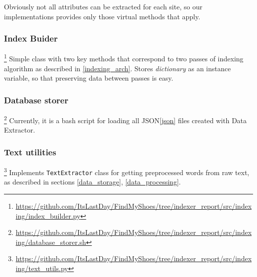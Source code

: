     Obviously not all attributes can be extracted for each site, so our implementations provides only those virtual methods that apply.
\subsubsection{Index Buider}
\footnote{\label{IndexBuilder}\url{https://github.com/ItsLastDay/FindMyShoes/tree/indexer_report/src/indexing/index_builder.py}}
Simple class with two key methods that correspond to two passes of indexing algorithm as de\-scribed in 
\ref{indexing_arch}. Stores \textit{dictionary} as an instance variable, so that pre\-serv\-ing data between passes is easy.


\subsubsection{Database storer}
\footnote{\url{https://github.com/ItsLastDay/FindMyShoes/tree/indexer_report/src/indexing/database_storer.sh}}
Currently, it is a bash script for loading all JSON\cref{json} files created with Data Extractor.

\subsubsection{Text utilities}
\footnote{\url{https://github.com/ItsLastDay/FindMyShoes/tree/indexer_report/src/indexing/text_utils.py}}
Implements \texttt{TextExtractor} class for getting pre\-pro\-cessed words from raw text, as described in sections \ref{data_storage}, \ref{data_processing}.


